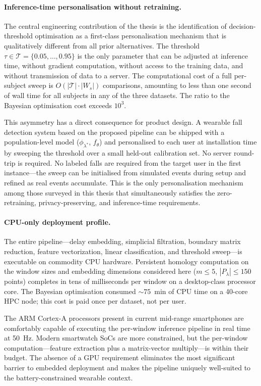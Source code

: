 \documentclass[onluarkali,ingilizce,yukseklisans,karton,LisansustuEgitim]{itutez}
\providecommand{\1}{\mathbf{1}}
\begin{document}
\paragraph{Inference-time personalisation without retraining.}
The central engineering contribution of the thesis is the identification of
decision-threshold optimisation as a first-class personalisation mechanism that
is qualitatively different from all prior alternatives.  The threshold
$\tau\in\mathcal{T}=\{0.05,\ldots,0.95\}$ is the only parameter that can be
adjusted at inference time, without gradient computation, without access to the
training data, and without transmission of data to a server.  The computational
cost of a full per-subject sweep is $O(|\mathcal{T}|\cdot|W_s|)$ comparisons,
amounting to less than one second of wall time for all subjects in any of the three
datasets.  The ratio to the Bayesian optimisation cost exceeds $10^3$.

This asymmetry has a direct consequence for product design.  A wearable fall
detection system based on the proposed pipeline can be shipped with a population-level
model ($\phi_{\lambda^*}$, $f_\theta$) and personalised to each user at installation
time by sweeping the threshold over a small held-out calibration set.  No server
round-trip is required.  No labeled falls are required from the target user in the
first instance---the sweep can be initialised from simulated events during setup and
refined as real events accumulate.  This is the only personalisation mechanism among
those surveyed in this thesis that simultaneously satisfies the zero-retraining,
privacy-preserving, and inference-time requirements.

\paragraph{CPU-only deployment profile.}
The entire pipeline---delay embedding, simplicial filtration, boundary matrix
reduction, feature vectorization, linear classification, and threshold sweep---is
executable on commodity CPU hardware.  Persistent homology computation on the
window sizes and embedding dimensions considered here ($m \leq 5$,
$|P_\lambda| \leq 150$ points) completes in tens of milliseconds per window on a
desktop-class processor core.  The Bayesian optimisation consumed ${\sim}75$~min
of CPU time on a 40-core HPC node; this cost is paid once per dataset, not per
user.

The ARM Cortex-A processors present in current mid-range smartphones are
comfortably capable of executing the per-window inference pipeline in real time at
50~Hz.  Modern smartwatch SoCs are more constrained, but the per-window
computation---feature extraction plus a matrix-vector multiply---is within their
budget.  The absence of a GPU requirement eliminates the most significant barrier
to embedded deployment and makes the pipeline uniquely well-suited to the
battery-constrained wearable context.
\end{document}
